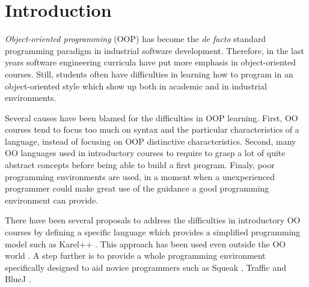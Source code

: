 \section{Introduction}
\label{sec:intro}


\emph{Object-oriented programming} (OOP) has become the \textit{de facto} standard programming paradigm in industrial software development.
Therefore, in the last years software engineering curricula have put more emphasis in object-oriented courses.
Still, students often have difficulties in learning how to program in an object-oriented style which show up both in academic and in industrial environments.

Several causes have been blamed for the difficulties in OOP learning.
First, OO courses tend to focus too much on syntax and the particular characteristics of a language, instead of focusing on OOP distinctive characteristics.
Second, many OO languages used in introductory courses to require to grasp a lot of quite abstract concepts before being able to build a first program.
Finaly, poor programming environments are used, in a moment when a unexperienced programmer could make great use of the guidance a good programming environment can provide.

\medskip 


There have been several proposals to address the difficulties in introductory OO courses 
by defining a specific language which provides a simplified programming model such as Karel++ \cite{bergin_karel++:_1996} .
This approach has been used even outside the OO world \cite{feurzeig_programming-languages_1970, pattis_karel_1981, gobstones}.
A step further is to provide a whole programming environment specifically designed to aid novice programmers 
such as Squeak \cite{ingalls_back_1997}, Traffic \cite{broy_outside-method_2003} and BlueJ \cite{bennedsen_bluej_2010}. 

